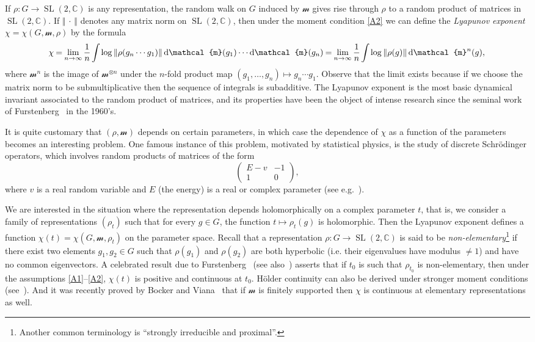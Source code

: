 \documentclass[10pt]{amsart}
\theoremstyle{definition}\newtheorem{defi}[theo]{Definition}\newtheorem{rema}[theo]{Remark}\newtheorem{exam}[theo]{Example}\newtheorem{exem}[theo]{Example}\newtheorem{nota}[theo]{Notation}
\DeclareMathOperator{\SL}{SL}
\newcommand{\sm}{\mathcal{m}}
\newcommand{\norm}[1]{\left\Vert#1\right\Vert}
\newcommand{\unsur}[1]{\frac{1}{#1}}
\newcommand{\SLC}{\SL(2,\mathbb C)}
\newcommand*{\dd}{\mathrm{d}}
\newcommand*{\dsm}{\dd \sm}
\newcommand*{\mk}{\mkern -1mu}
\begin{document}
If $\rho:G \to \SLC$ is any representation, the random walk on $G$ induced by $\sm$ gives rise through $\rho$ to a random product of matrices in $\SLC$. If $\norm{{\,\cdot\,}}$ denotes any matrix norm on $\SLC$, then under the moment condition \eqref{A2} we can define the \emph{Lyapunov exponent} $\chi = \chi(G, \sm, \rho)$ by the formula
\begin{equation}
\label{def:lyapunov exponent intro}
\!\chi \mk=\mk \lim_{n\to\infty} \unsur{n} \mk\int\mk \log\norm{\rho(g_n\cdots g_1)} \dsm(g_1) \cdots \dsm(g_n) \mk=\mk \lim_{n\to\infty} \unsur{n} \mk\int\mk \log\norm{\rho(g)} \dsm^n(g),
\end{equation}
where $\sm^n$ is the image of $\sm^{\otimes n}$ under the $n$-fold product map $(g_1, \ldots, g_n)\mapsto g_n\cdots g_1$. Observe that the limit exists because if we choose the matrix norm to be submultiplicative then the sequence of integrals is subadditive. The Lyapunov exponent is the most basic dynamical invariant associated to the random product of matrices, and its properties have been the object of intense research since the seminal work of Furstenberg~\cite{furstenberg} in the 1960's.

It is quite customary that $(\rho, \sm)$ depends on certain parameters, in which case the dependence of $\chi$ as a function of the parameters becomes an interesting problem. One famous instance of this problem, motivated by statistical physics, is the study of discrete Schr\"odinger operators, which involves random products of matrices of the form
\[
\begin{pmatrix} E-v & -1 \\ 1 & 0
\end{pmatrix},
\]
where $v$ is a real random variable and $E$ (the energy) is a real or complex parameter
(see e.g.~\cite{bougerol-lacroix}).


We are interested in the situation where the representation depends holomorphically on a complex parameter $t$, that is, we consider a family of representations $(\rho_t)$ such that for every $g\in G$, the function $t\mapsto \rho_t(g)$ is holomorphic. Then the Lyapunov exponent defines a function $\chi(t) = \chi(G, \sm, \rho_t)$ on the parameter space. Recall that a representation $\rho: G \to \SLC$ is said to be \emph{non-elementary}\footnote{Another common terminology is ``strongly irreducible and proximal''.} if there exist two elements $g_1, g_2 \in G$ such that $\rho(g_1)$ and $\rho(g_2)$ are both hyperbolic (i.e. their eigenvalues have modulus $\neq 1$) and have no common eigenvectors. A celebrated result due to Furstenberg~\cite{furstenberg} (see also~\cite{furstenberg-kifer}) asserts that if $t_0$ is such that $\rho_{t_0}$ is non-elementary, then under the assumptions \eqref{A1}--\eqref{A2}, $\chi(t)$ is positive and continuous at $t_0$. H\"older continuity can also be derived under stronger moment conditions (see~\cite{lepage-holder}). And it was recently proved by Bocker and Viana~\cite{bocker-viana} that if $\sm$ is finitely supported then $\chi$ is continuous at elementary representations as well.
\end{document}
